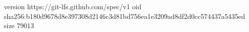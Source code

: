 version https://git-lfs.github.com/spec/v1
oid sha256:b180d9678d8e397308d2146c3d81bd756ea1e3209ad8df2d0cc574437a5435ed
size 79013
